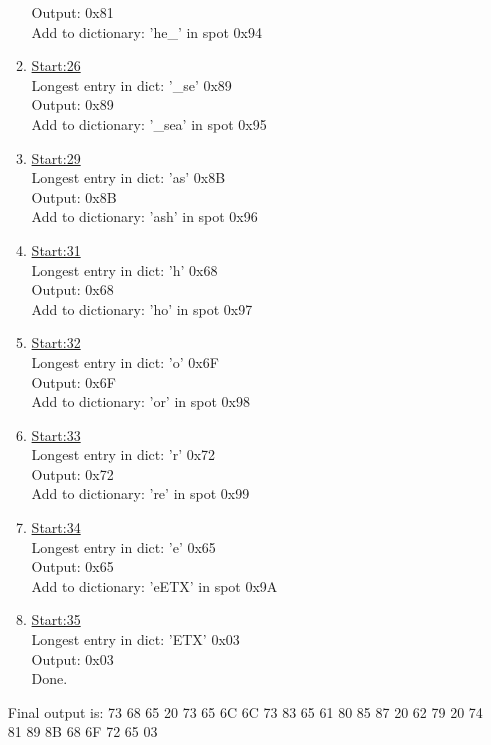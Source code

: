 \documentclass[11pt]{article}
\begin{document}
\begin{enumerate}
\begin{multicols}{2}
\begin{enumerate}
                Output: 0x81    \\
                Add to dictionary: 'he\_' in spot 0x94
            \item
                \underline{Start:26}  \\
                Longest entry in dict: '\_se' 0x89 \\
                Output: 0x89    \\
                Add to dictionary: '\_sea' in spot 0x95
            \item
                \underline{Start:29}  \\
                Longest entry in dict: 'as' 0x8B \\
                Output: 0x8B    \\
                Add to dictionary: 'ash' in spot 0x96
            \item
                \underline{Start:31}  \\
                Longest entry in dict: 'h' 0x68 \\
                Output: 0x68    \\
                Add to dictionary: 'ho' in spot 0x97
            \item
                \underline{Start:32}  \\
                Longest entry in dict: 'o' 0x6F \\
                Output: 0x6F    \\
                Add to dictionary: 'or' in spot 0x98
            \item
                \underline{Start:33}  \\
                Longest entry in dict: 'r' 0x72 \\
                Output: 0x72    \\
                Add to dictionary: 're' in spot 0x99
            \item
                \underline{Start:34}  \\
                Longest entry in dict: 'e' 0x65 \\
                Output: 0x65    \\
                Add to dictionary: 'eETX' in spot 0x9A
            \item
                \underline{Start:35}  \\
                Longest entry in dict: 'ETX' 0x03 \\
                Output: 0x03    \\
                Done.
         \end{enumerate}
         \end{multicols}
         Final output is: 73 68 65 20 73 65 6C 6C 73 83 65 61 80 85 87 20 62 79 20 74 81 89 8B 68 6F 72 65 03
\end{enumerate}
\end{document}
